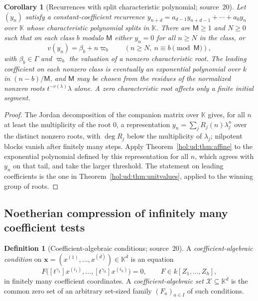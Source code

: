 \documentclass[11pt]{article}
\numberwithin{equation}{section}
\newtheorem{corollary}[theorem]{Corollary}
\theoremstyle{definition}
\newtheorem{definition}[theorem]{Definition}
\theoremstyle{remark}
\newcommand{\KK}{\mathbb K}
\begin{document}
\begin{corollary}[Recurrences with split characteristic polynomial;
source~20]\label{hol:rc:cor:split}
Let $(y_n)$ satisfy a constant-coefficient recurrence
$y_{n+d}=a_{d-1}y_{n+d-1}+\cdots+a_0y_n$ over $\KK$ whose characteristic
polynomial splits in $\KK$. There are $\mathsf M\ge1$ and $N\ge0$ such that on
each class $b$ modulo $\mathsf M$ either $y_n=0$ for all $n\ge N$ in the class,
or
\[
 v(y_n)=\beta_b+n\varpi_b\qquad(n\ge N,\ n\equiv b\pmod{\mathsf M}),
\]
with $\beta_b\in\Gamma$ and $\varpi_b$ the valuation of a nonzero
characteristic root. The leading coefficient on each nonzero class is
eventually an exponential polynomial over $k$ in $(n-b)/\mathsf M$, and
$\mathsf M$ may be chosen from the residues of the normalized nonzero roots
$t^{-v(\lambda)}\lambda$ alone. A zero characteristic root affects only a
finite initial segment.
\end{corollary}

\begin{proof}
The Jordan decomposition of the companion matrix over $\KK$ gives, for all $n$
at least the multiplicity of the root $0$, a representation
$y_n=\sum_jR_j(n)\lambda_j^n$ over the distinct nonzero roots, with
$\deg R_j$ below the multiplicity of $\lambda_j$; nilpotent blocks vanish
after finitely many steps. Apply Theorem~\ref{hol:ud:thm:affine} to the
exponential polynomial defined by this representation for all $n$, which
agrees with $y_n$ on that tail, and take the larger threshold. The statement on
leading coefficients is the one in Theorem~\ref{hol:ud:thm:unitvalues}, applied
to the winning group of roots.
\end{proof}

\subsection{Noetherian compression of infinitely many coefficient tests}
\label{hol:rc:sub:compression}

\begin{definition}[Coefficient-algebraic conditions; source~20]
\label{hol:rc:def:conditions}
A \emph{coefficient-algebraic condition} on
$\mathbf x=(x^{(1)},\ldots,x^{(\bar d)})\in\KK^{\bar d}$ is an equation
\[
 F\bigl([t^{\gamma_1}]x^{(i_1)},\ldots,[t^{\gamma_h}]x^{(i_h)}\bigr)=0,
 \qquad F\in k[Z_1,\ldots,Z_h],
\]
in finitely many coefficient coordinates. A \emph{coefficient-algebraic set}
$\mathcal X\subseteq\KK^{\bar d}$ is the common zero set of an arbitrary
set-sized family $(F_a)_{a\in I}$ of such conditions.
\end{definition}
\end{document}
